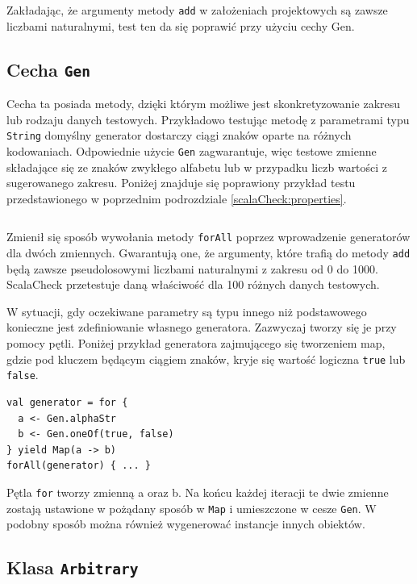 \documentclass[wimgr]{xmgr}
\begin{document}
Zakładając, że argumenty metody \texttt{add} w założeniach projektowych są zawsze liczbami naturalnymi, test ten da się poprawić przy użyciu cechy Gen.

\subsection{Cecha \texttt{Gen}} 

Cecha ta posiada metody, dzięki którym możliwe jest skonkretyzowanie zakresu lub rodzaju danych testowych. Przykładowo testując metodę z parametrami typu \texttt{String} domyślny generator dostarczy ciągi znaków oparte na różnych kodowaniach. Odpowiednie użycie \texttt{Gen} zagwarantuje, więc testowe zmienne składające się ze znaków zwykłego alfabetu lub w przypadku liczb wartości z sugerowanego zakresu. Poniżej znajduje się poprawiony przykład testu przedstawionego w poprzednim podrozdziale \ref{scalaCheck:properties}.

\inputminted[fontsize=\small]{scala}{code/CalcTestOk.scala}

Zmienił się sposób wywołania metody \texttt{forAll} poprzez wprowadzenie generatorów dla dwóch zmiennych. Gwarantują one, że argumenty, które trafią do metody \texttt{add} będą zawsze pseudolosowymi liczbami naturalnymi z zakresu od 0 do 1000. ScalaCheck przetestuje daną właściwość dla 100 różnych danych testowych. 

W sytuacji, gdy oczekiwane parametry są typu innego niż podstawowego konieczne jest zdefiniowanie własnego generatora. Zazwyczaj tworzy się je przy pomocy pętli. Poniżej przykład generatora zajmującego się tworzeniem map, gdzie pod kluczem będącym ciągiem znaków, kryje się wartość logiczna \texttt{true} lub \texttt{false}.

\begin{verbatim}
val generator = for {
  a <- Gen.alphaStr  
  b <- Gen.oneOf(true, false)
} yield Map(a -> b)
forAll(generator) { ... }
\end{verbatim}

Pętla \texttt{for} tworzy zmienną a oraz b. Na końcu każdej iteracji te dwie zmienne zostają ustawione w pożądany sposób w \texttt{Map} i umieszczone w cesze \texttt{Gen}. W podobny sposób można również wygenerować instancje innych obiektów. 

\subsection{Klasa \texttt{Arbitrary}}
\end{document}
